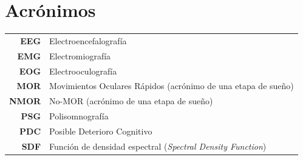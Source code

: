 \documentclass[12pt,a4paper]{mitthesis}
\begin{document}

\chapter*{Acr\'onimos}

\begin{tabular}{rl}
\textbf{EEG} & Electroencefalograf\'ia
\\
\textbf{EMG} & Electromiograf\'ia
\\
\textbf{EOG} & Electrooculograf\'ia
\\
\textbf{MOR} & Movimientos Oculares R\'apidos (acr\'onimo de una etapa de sue\~no)
\\
\textbf{NMOR}& No-MOR (acr\'onimo de una etapa de sue\~no)
\\
\textbf{PSG} & Polisomnograf\'ia
\\
\textbf{PDC} & Posible Deterioro Cognitivo
\\
\textbf{SDF} & Funci\'on de densidad espectral (\textit{Spectral Density Function})
\end{tabular}

\newpage


\thispagestyle{empty}

\tableofcontents
\newpage

\end{document}
